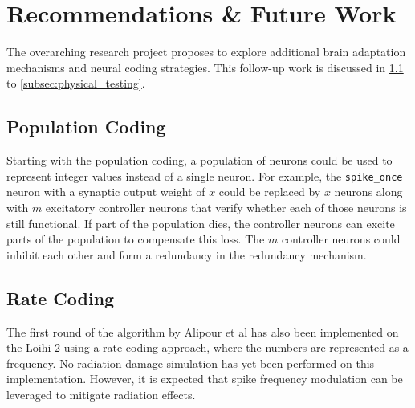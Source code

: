 \section{Recommendations \& Future Work}\label{sec:recommendations}

The overarching research project proposes to explore additional brain adaptation mechanisms and neural coding strategies. This follow-up work is discussed in \cref{subsec:population_coding} to  \cref{subsec:physical_testing}. 
\subsection{Population Coding}\label{subsec:population_coding}
Starting with the population coding, a population of neurons could be used to represent integer values instead of a single neuron. For example, the \verb+spike_once+ neuron with a synaptic output weight of $x$ could be replaced by $x$ neurons along with $m$ excitatory controller neurons that verify whether each of those neurons is still functional. If part of the population dies, the controller neurons can excite parts of the population to compensate this loss. The $m$ controller neurons could inhibit each other and form a redundancy in the redundancy mechanism.

\subsection{Rate Coding}\label{subsec:rate_coding}
The first round of the algorithm by Alipour et al has also been implemented on the Loihi 2 using a rate-coding approach, where the numbers are represented as a frequency. No radiation damage simulation has yet been performed on this implementation. However, it is expected that spike frequency modulation can be leveraged to mitigate radiation effects.

